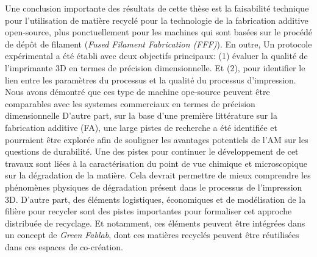 \bigskip


Une conclusion importante des résultats de cette thèse est la faisabilité technique pour l'utilisation de matière recyclé pour la technologie de la fabrication additive open-source, plus ponctuellement pour les machines qui sont basées sur le procédé de dépôt de filament (\textit{Fused Filament Fabrication (FFF)}).
%
En outre, Un protocole expérimental a été établi avec deux objectifs principaux: (1) évaluer la qualité de l'imprimante 3D en termes de précision dimensionnelle.
Et (2), pour identifier le lien entre les paramètres du processus et la qualité du processus d'impression.
Nous avons démontré que ces type de machine ope-source peuvent être comparables avec les systemes commerciaux en termes de précision dimensionnelle
%
D'autre part, sur la base d'une première littérature sur la fabrication additive (FA), une large pistes de recherche a été identifiée et pourraient être explorée afin de souligner les avantages potentiels de l'AM sur les questions de durabilité.
Une des pistes pour continuer le développement de cet travaux sont liées à la caractérisation du point de vue chimique et microscopique sur la dégradation de la matière. 
Cela devrait permettre de mieux comprendre les phénomènes physiques de dégradation présent dans le processus de l'impression 3D.
D'autre part, des éléments logistiques, économiques et de modélisation de la filière pour recycler sont des pistes importantes pour formaliser cet approche distribuée de recyclage.
Et notamment, ces éléments peuvent être intégrées dans un concept de \textit{Green Fablab}, dont ces matières recyclés peuvent être réutilisées dans ces espaces de co-création.









